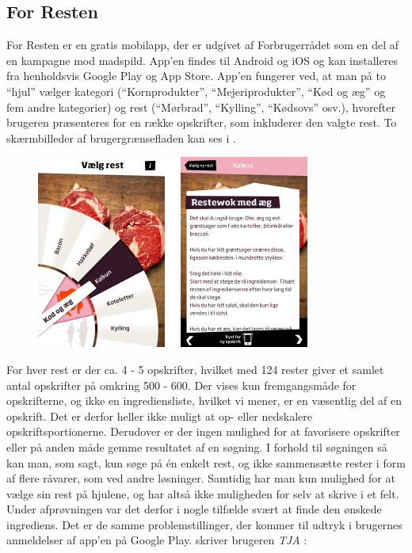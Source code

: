 \subsection{For Resten}
\label{subsec:forresten}

For Resten er en gratis mobilapp, der er udgivet af Forbrugerrådet som en del af en kampagne mod madspild. App’en findes til Android og iOS og kan installeres fra henholdsvis Google Play og App Store. App’en fungerer ved, at man på to ``hjul'' vælger kategori (``Kornprodukter'', ``Mejeriprodukter'', ``Kød og æg'' og fem andre kategorier) og rest (\fx ``Mørbrad'', ``Kylling'', ``Kødsovs'' osv.), hvorefter brugeren præsenteres for en række opskrifter, som inkluderer den valgte rest. To skærmbilleder af brugergrænsefladen kan ses i .

\begin{figure}[H]
\centering
\includegraphics[scale=0.7]{billeder/forbilleder/forresten.png}
\label{fig:forresten}
\end{figure}

For hver rest er der ca. 4 - 5 opskrifter, hvilket med 124 rester giver et samlet antal opskrifter på omkring 500 - 600. Der vises kun fremgangsmåde for opskrifterne, og ikke en ingrediensliste, hvilket vi mener, er en væsentlig del af en opskrift. Det er derfor heller ikke muligt at op- eller nedskalere opskriftsportionerne. Derudover er der ingen mulighed for at favorisere opskrifter eller på anden måde gemme resultatet af en søgning. I forhold til søgningen så kan man, som sagt, kun søge på én enkelt rest, og ikke sammensætte rester i form af flere råvarer, som ved andre løsninger. Samtidig har man kun mulighed for at vælge sin rest på hjulene, og har altså ikke muligheden for selv at skrive i et felt. Under afprøvningen var det derfor i nogle tilfælde svært at finde den ønskede ingrediens. Det er de samme problemstillinger, der kommer til udtryk i brugernes anmeldelser af app’en på Google Play. \Fx skriver brugeren \textit{TJA} \cite{tja}:

